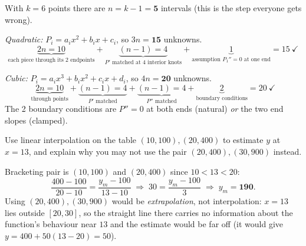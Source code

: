 \begin{probbox}
\ans With $k=6$ points there are $n = k-1 = \mathbf{5}$ intervals (this is the step everyone gets wrong).

\emph{Quadratic:} $P_i = a_ix^2+b_ix+c_i$, so $3n = \mathbf{15}$ unknowns.
\[
\underbrace{2n = 10}_{\text{each piece through its 2 endpoints}} + \underbrace{(n-1) = 4}_{P'\text{ matched at 4 interior knots}} + \underbrace{1}_{\text{assumption } P_1''=0 \text{ at one end}} = 15 \ \checkmark
\]

\emph{Cubic:} $P_i = a_ix^3+b_ix^2+c_ix+d_i$, so $4n = \mathbf{20}$ unknowns.
\[
\underbrace{2n = 10}_{\text{through points}} + \underbrace{(n-1) = 4}_{P'\text{ matched}} + \underbrace{(n-1) = 4}_{P''\text{ matched}} + \underbrace{2}_{\text{boundary conditions}} = 20 \ \checkmark
\]
The 2 boundary conditions are $P''=0$ at both ends (natural) \emph{or} the two end slopes (clamped).

 Use linear interpolation on the table $(10,100), (20,400)$ to estimate $y$ at $x=13$, and explain why you may not use the pair $(20,400),(30,900)$ instead.

\ans Bracketing pair is $(10,100)$ and $(20,400)$ since $10 < 13 < 20$:
\[
\frac{400-100}{20-10} = \frac{y_m-100}{13-10} \;\Longrightarrow\; 30 = \frac{y_m-100}{3} \;\Longrightarrow\; y_m = \mathbf{190}.
\]
Using $(20,400),(30,900)$ would be \emph{extrapolation}, not interpolation: $x=13$ lies outside $[20,30]$, so the straight line there carries no information about the function's behaviour near $13$ and the estimate would be far off (it would give $y = 400+50(13-20) = 50$).
\end{probbox}

